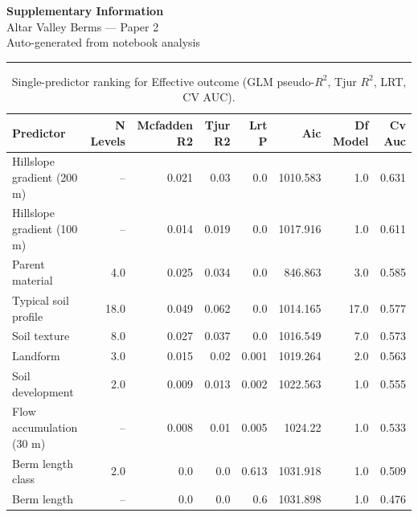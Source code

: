 \documentclass[11pt, a4paper]{article}
\begin{document}
\begin{center}
  {\LARGE \textbf{Supplementary Information}} \\[0.4em]
  {\large Altar Valley Berms --- Paper 2} \\[0.3em]
  {\small Auto-generated from notebook analysis}
\end{center}

\vspace{1em}\hrule\vspace{1.5em}

\begin{table}[H]
  \centering
  \caption{Single-predictor ranking for Effective outcome (GLM pseudo-$R^2$, Tjur $R^2$, LRT, CV AUC).}
  \label{tab:si_ranked_effective}
  \small
  \begin{tabular}{lrrrrrrr}
    \toprule
    Predictor & N Levels & Mcfadden R2 & Tjur R2 & Lrt P & Aic & Df Model & Cv Auc \\
    \midrule
    Hillslope gradient (200 m) & -- & 0.021 & 0.03 & 0.0 & 1010.583 & 1.0 & 0.631 \\
    Hillslope gradient (100 m) & -- & 0.014 & 0.019 & 0.0 & 1017.916 & 1.0 & 0.611 \\
    Parent material & 4.0 & 0.025 & 0.034 & 0.0 & 846.863 & 3.0 & 0.585 \\
    Typical soil profile & 18.0 & 0.049 & 0.062 & 0.0 & 1014.165 & 17.0 & 0.577 \\
    Soil texture & 8.0 & 0.027 & 0.037 & 0.0 & 1016.549 & 7.0 & 0.573 \\
    Landform & 3.0 & 0.015 & 0.02 & 0.001 & 1019.264 & 2.0 & 0.563 \\
    Soil development & 2.0 & 0.009 & 0.013 & 0.002 & 1022.563 & 1.0 & 0.555 \\
    Flow accumulation (30 m) & -- & 0.008 & 0.01 & 0.005 & 1024.22 & 1.0 & 0.533 \\
    Berm length class & 2.0 & 0.0 & 0.0 & 0.613 & 1031.918 & 1.0 & 0.509 \\
    Berm length & -- & 0.0 & 0.0 & 0.6 & 1031.898 & 1.0 & 0.476 \\
    \bottomrule
  \end{tabular}
\end{table}

\vspace{2em}
\end{document}
